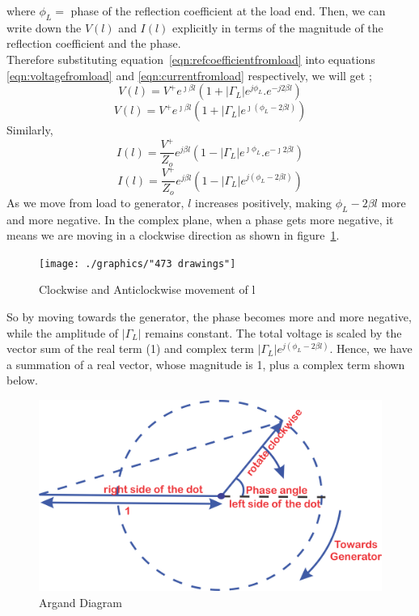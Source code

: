 where $\phi_L =$ phase of the reflection coefficient at the load end. Then, we can write down the $V(l)$ and $I(l)$ explicitly in terms of the magnitude of the reflection coefficient and the phase.\\
Therefore substituting equation~\ref{eqn:refcoefficientfromload} into equations \ref{eqn:voltagefromload} and \ref{eqn:currentfromload} respectively, we will get ;
\begin{equation*}
V(l) = V^{+}e^{\jmath\beta l}(1 + |\Gamma_L|e^{j\phi_L} . e^{-j 2 \beta l})
\end{equation*}
\begin{equation}
V(l) = V^{+}e^{\jmath\beta l}(1 + |\Gamma_L|  e^{\jmath(\phi_L -2 \beta l)})
\end{equation}
Similarly,
\begin{equation*}
I(l) = \frac{V^+}{Z_o}e ^{j \beta l}( 1 - |\Gamma_L|e^{\jmath\phi_L} . e^{-\jmath 2\beta l})
\end{equation*}
\begin{equation}
I(l) = \frac{V^+}{Z_o}e ^{j \beta l}( 1 -|\Gamma_L|  e^{j(\phi_L -2 \beta l)})
\end{equation}
As we move from load to generator, $l$ increases positively, making $\phi_L -2 \beta l$ more and more negative. In the complex plane, when a phase gets more negative, it means we are moving in a clockwise direction as shown in figure~\ref{fig:473-drawings}.
\begin{figure}[h]
\centering
\texttt{[image: ./graphics/"473 drawings"]}
\caption{Clockwise and Anticlockwise movement of l}
\label{fig:473-drawings}
\end{figure}

So by moving towards the generator, the phase becomes more and more negative, while the amplitude of $|\Gamma_L|$ remains constant. The total voltage is scaled by the vector sum of the real term (1) and complex term $|\Gamma_L|  e^{j(\phi_L -2 \beta l)}$. Hence, we have a summation of a real vector, whose magnitude is 1, plus a complex term shown below. 
\begin{figure}[h]
\centering
\includegraphics[width=0.8\linewidth]{./graphics/kjhgfdwert}
\caption{Argand Diagram}
\label{fig:kjhgfdwert}
\end{figure}

